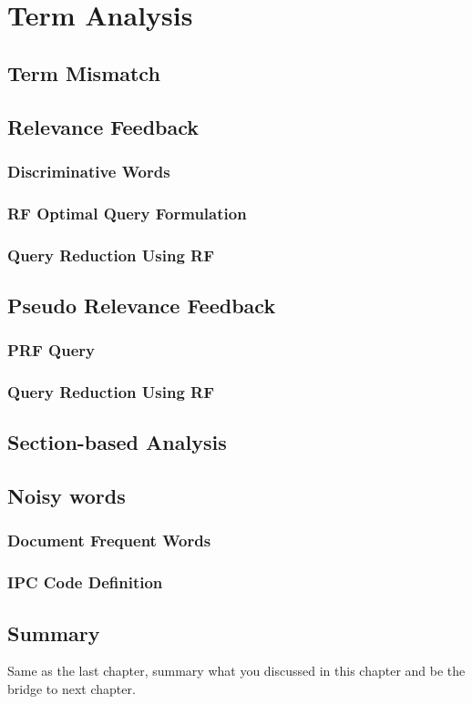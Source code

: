 \chapter{Term Analysis}
\label{cha:analysis}

\section{Term Mismatch}
\label{sec:termmismatch}

\section{Relevance Feedback}

\subsection{Discriminative Words}
\label{sec:discriminative}

\subsection{RF Optimal Query Formulation}
\label{sec:formulation}

\subsection{Query Reduction Using RF}

\section{Pseudo Relevance Feedback}

\subsection{PRF Query}
\subsection{Query Reduction Using RF}

\section{Section-based Analysis}

\section{Noisy words}

\subsection{Document Frequent Words}

\subsection{IPC Code Definition}

\section{Summary}
Same as the last chapter, summary what you discussed in this chapter and
be the bridge to next chapter.
